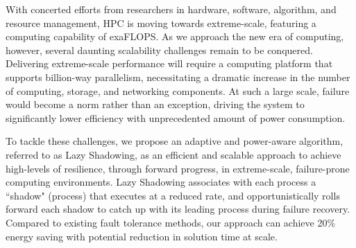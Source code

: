 


With concerted efforts from researchers in hardware, software, algorithm, and resource management, HPC is moving towards extreme-scale, featuring a computing capability of exaFLOPS. 
As we approach the new era of computing, however, several daunting scalability challenges remain to be conquered. Delivering extreme-scale performance will require a computing platform that supports billion-way parallelism, necessitating a dramatic increase in the number of computing, storage, and networking components. At such a large scale, failure would become a norm rather than an exception, driving the system to significantly lower efficiency with unprecedented amount of power consumption. %

To tackle these challenges, we propose an adaptive and power-aware algorithm, referred to as Lazy Shadowing, as an efficient and scalable approach to achieve high-levels of resilience, through forward progress, in extreme-scale, failure-prone computing environments. 
Lazy Shadowing associates with each process a ``shadow" (process) that executes at a reduced rate, and opportunistically rolls forward each shadow to catch up with its leading process during failure recovery.
Compared to existing fault tolerance methods, our approach can achieve 20\% energy saving with potential reduction in solution time at scale.
